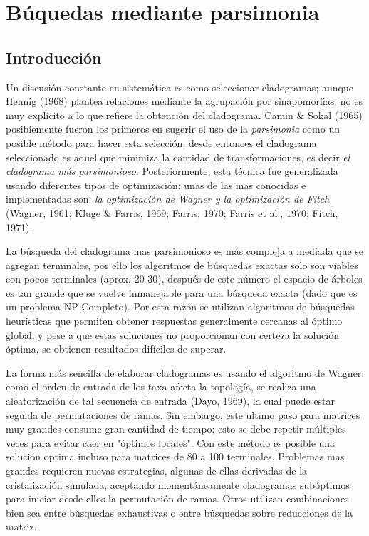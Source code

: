 
\chapter{B\'uquedas mediante parsimonia} %
\label{cha:parsimonia}

\section*{Introducci\'on}
Un discusi\'on constante en sistem\'atica es como seleccionar cladogramas; aunque {\color{red}Hennig (1968)} plantea relaciones mediante la agrupaci\'on por sinapomorfias,  no es muy expl\'icito a lo que refiere la obtenci\'on del cladograma. {\color{red}Camin \& Sokal (1965)} posiblemente fueron los primeros en sugerir el uso de la \textit{parsimonia} como un posible m\'etodo para hacer esta selecci\'on; desde entonces el cladograma seleccionado es aquel que minimiza la cantidad de transformaciones,  es decir \textit{el cladograma más parsimonioso}. Posteriormente,  esta t\'ecnica fue generalizada usando diferentes tipos de optimizaci\'on: unas de las mas conocidas e implementadas son: \textit{la optimizaci\'on de Wagner y la optimizaci\'on de Fitch} {\color{red}(Wagner,  1961; Kluge \& Farris,  1969; Farris,  1970; Farris et al., 1970; Fitch, 1971)}.

La b\'usqueda del cladograma mas parsimonioso es m\'as compleja a mediada que se agregan terminales,  por ello los algoritmos de b\'usquedas exactas solo son viables con pocos terminales (aprox. 20-30),  despu\'es de este n\'umero el espacio de \'arboles es tan grande que se vuelve inmanejable para una búsqueda exacta (dado que es un problema NP-Completo). Por esta raz\'on se utilizan algoritmos de b\'usquedas heur\'isticas que permiten obtener respuestas generalmente cercanas al \'optimo global,  y pese a que estas soluciones no proporcionan con certeza la solución \'optima, se obtienen  resultados  dif\'iciles de superar.

La forma m\'as sencilla de elaborar cladogramas es usando el algoritmo de Wagner: como el orden de entrada de los taxa afecta la topolog\'ia,  se realiza una aleatorización de tal secuencia de entrada {\color{red} (Dayo, 1969)},  la cual puede estar seguida de permutaciones de ramas. Sin embargo,  este ultimo paso para matrices muy grandes consume gran cantidad de tiempo; esto se debe repetir m\'ultiples veces para evitar caer en "\'optimos locales". Con este método es posible una solución optima incluso para matrices de 80 a 100 terminales. Problemas mas grandes requieren nuevas estrategias,  algunas de ellas derivadas de la cristalizaci\'on simulada,  aceptando moment\'aneamente cladogramas sub\'optimos para iniciar desde ellos la permutaci\'on de ramas. Otros utilizan combinaciones bien sea entre b\'usquedas exhaustivas o entre búsquedas sobre reducciones de la matriz.

